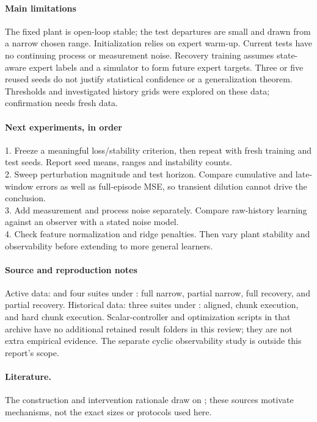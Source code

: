 \documentclass{l4dc2026}
\begin{document}
\paragraph{Main limitations}
The fixed plant is open-loop stable; the test departures are small and drawn from a narrow chosen range. Initialization relies on expert warm-up. Current tests have no continuing process or measurement noise. Recovery training assumes state-aware expert labels and a simulator to form future expert targets. Three or five reused seeds do not justify statistical confidence or a generalization theorem. Thresholds and investigated history grids were explored on these data; confirmation needs fresh data.

\paragraph{Next experiments, in order}
1. Freeze a meaningful loss/stability criterion, then repeat with fresh training and test seeds. Report seed means, ranges and instability counts.\\
2. Sweep perturbation magnitude and test horizon. Compare cumulative and late-window errors as well as full-episode MSE, so transient dilution cannot drive the conclusion.\\
3. Add measurement and process noise separately. Compare raw-history learning against an observer with a stated noise model.\\
4. Check feature normalization and ridge penalties. Then vary plant stability and observability before extending to more general learners.

\paragraph{Source and reproduction notes}
{\small Active data:  and four suites under : full narrow, partial narrow, full recovery, and partial recovery. Historical data: three suites under : aligned, chunk execution, and hard chunk execution. Scalar-controller and optimization scripts in that archive have no additional retained result folders in this review; they are not extra empirical evidence. The separate cyclic observability study is outside this report's scope.\par}

\paragraph{Literature.} The construction and intervention rationale draw on \citet{simchowitz2025,laskey2017,ross2011,zhang2025}; these sources motivate mechanisms, not the exact sizes or protocols used here.
\end{document}
